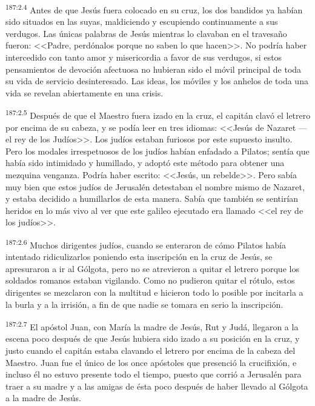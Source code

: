 \par 
\textsuperscript{187:2.4} Antes de que Jesús fuera colocado en su cruz, los dos bandidos ya habían sido situados en las suyas, maldiciendo y escupiendo continuamente a sus verdugos. Las únicas palabras de Jesús mientras lo clavaban en el travesaño fueron: <<Padre, perdónalos porque no saben lo que hacen>>. No podría haber intercedido con tanto amor y misericordia a favor de sus verdugos, si estos pensamientos de devoción afectuosa no hubieran sido el móvil principal de toda su vida de servicio desinteresado. Las ideas, los móviles y los anhelos de toda una vida se revelan abiertamente en una crisis.

\par 
\textsuperscript{187:2.5} Después de que el Maestro fuera izado en la cruz, el capitán clavó el letrero por encima de su cabeza, y se podía leer en tres idiomas: <<Jesús de Nazaret ---el rey de los Judíos>>. Los judíos estaban furiosos por este supuesto insulto. Pero los modales irrespetuosos de los judíos habían enfadado a Pilatos; sentía que había sido intimidado y humillado, y adoptó este método para obtener una mezquina venganza. Podría haber escrito: <<Jesús, un rebelde>>. Pero sabía muy bien que estos judíos de Jerusalén detestaban el nombre mismo de Nazaret, y estaba decidido a humillarlos de esta manera. Sabía que también se sentirían heridos en lo más vivo al ver que este galileo ejecutado era llamado <<el rey de los judíos>>.

\par 
\textsuperscript{187:2.6} Muchos dirigentes judíos, cuando se enteraron de cómo Pilatos había intentado ridiculizarlos poniendo esta inscripción en la cruz de Jesús, se apresuraron a ir al Gólgota, pero no se atrevieron a quitar el letrero porque los soldados romanos estaban vigilando. Como no pudieron quitar el rótulo, estos dirigentes se mezclaron con la multitud e hicieron todo lo posible por incitarla a la burla y a la irrisión, a fin de que nadie se tomara en serio la inscripción.

\par 
\textsuperscript{187:2.7} El apóstol Juan, con María la madre de Jesús, Rut y Judá, llegaron a la escena poco después de que Jesús hubiera sido izado a su posición en la cruz, y justo cuando el capitán estaba clavando el letrero por encima de la cabeza del Maestro. Juan fue el único de los once apóstoles que presenció la crucifixión, e incluso él no estuvo presente todo el tiempo, puesto que corrió a Jerusalén para traer a su madre y a las amigas de ésta poco después de haber llevado al Gólgota a la madre de Jesús.

